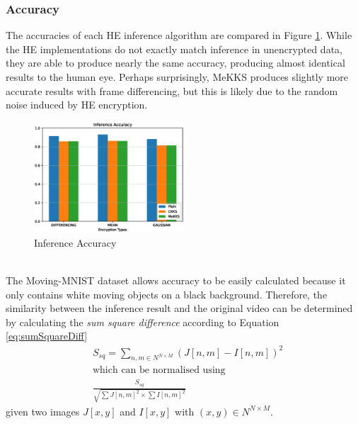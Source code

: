 \subsubsection{Accuracy}
\indent \indent
The accuracies of each HE inference algorithm are compared in Figure \ref{fig:accuracy}. While the HE implementations do not exactly match inference in unencrypted data, they are able to produce nearly the same accuracy, producing almost identical results to the human eye. Perhaps surprisingly, MeKKS produces slightly more accurate results with frame differencing, but this is likely due to the random noise induced by HE encryption. 
\begin{figure}[h!]
    \centering
    \includegraphics[width=0.5\textwidth]{figures/accuracy}
    \caption{Inference Accuracy}
    \label{fig:accuracy}
\end{figure}
\smallskip \\ \indent
The Moving-MNIST dataset allows accuracy to be easily calculated because it only contains white moving objects on a black background. Therefore, the similarity between the inference result and the original video can be determined by calculating the \textit{sum square difference} according to Equation \ref{eq:sumSquareDiff}
\begin{equation}
    \label{eq:sumSquareDiff}
    \begin{split}
    &S_{sq} = \sum_{n,m \in N^{N \times M}} (J[n, m] - I[n, m])^2 \\
    &\textrm{which can be normalised using} \\
    &\frac{S_{sq}}{\sqrt{\sum J[n,m]^2 \times \sum I[n,m]^2}}
    \end{split}
\end{equation}
given two images $J[x,y]$ and $I[x,y]$ with $(x,y) \in N^{N \times M}$.

